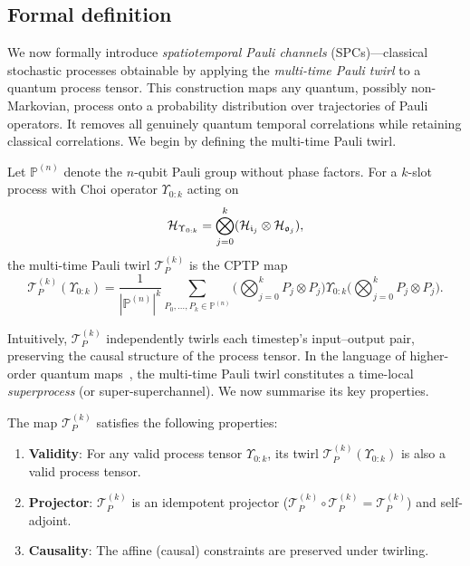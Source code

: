 \subsection{Formal definition}
We now formally introduce \emph{spatiotemporal Pauli channels} (SPCs)---classical stochastic processes obtainable by applying the \emph{multi-time Pauli twirl} to a quantum process tensor. This construction maps any quantum, possibly non-Markovian, process onto a probability distribution over trajectories of Pauli operators. It removes all genuinely quantum temporal correlations while retaining classical correlations. We begin by defining the multi-time Pauli twirl.
\begin{definition}\label{def:multi-time-twirl}
    Let \(\mathbb{P}^{(n)}\) denote the \(n\)-qubit Pauli group without phase factors. For a \(k\)-slot process with Choi operator \(\Upsilon_{0:k}\) acting on
    \begin{equation*}
        \mathcal{H}_{\Upsilon_{0:k}} = \bigotimes_{j=0}^k(\mathcal{H}_{\mathfrak{i}_j} \otimes \mathcal{H}_{\mathfrak{o}_j}),
    \end{equation*}
    the multi-time Pauli twirl \(\mathcal{T}_P^{(k)}\) is the CPTP map
    \begin{equation}\label{eq:twirl-upsilon}
        \mathcal{T}_P^{(k)}(\Upsilon_{0:k}) = 
        \frac{1}{|\mathbb{P}^{(n)}|^k}
        \sum_{P_0,\dots,P_k\in\mathbb{P}^{(n)}}
        \Bigg(\bigotimes_{j=0}^k P_j\otimes P_j\Bigg)
        \Upsilon_{0:k}
        \Bigg(\bigotimes_{j=0}^k P_j\otimes P_j\Bigg).
    \end{equation}
\end{definition}
Intuitively, \(\mathcal{T}_P^{(k)}\) independently twirls each timestep’s input–output pair, preserving the causal structure of the process tensor. In the language of higher-order quantum maps~\cite{tarantohigherorder2025}, the multi-time Pauli twirl constitutes a time-local \emph{superprocess} (or super-superchannel). We now summarise its key properties.
\begin{proposition}[Properties]
    The map \(\mathcal{T}_P^{(k)}\) satisfies the following properties:
    \begin{enumerate}
        \item \textbf{Validity}: For any valid process tensor \(\Upsilon_{0:k}\), its twirl \(\mathcal{T}_P^{(k)}(\Upsilon_{0:k})\) is also a valid process tensor.
        \item \textbf{Projector}: \(\mathcal{T}_P^{(k)}\) is an idempotent projector (\(\mathcal{T}_P^{(k)} \circ \mathcal{T}_P^{(k)} = \mathcal{T}_P^{(k)}\)) and self-adjoint.
        \item \textbf{Causality}: The affine (causal) constraints are preserved under twirling.
    \end{enumerate}
\end{proposition}
